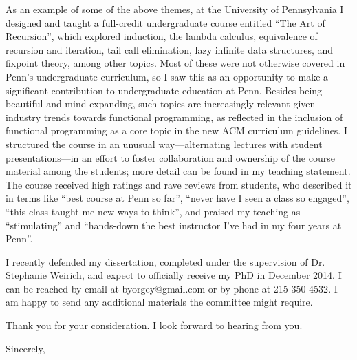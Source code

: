 \begin{letter}{\thereaddress}
{  As an example of some of the above themes, at the University of
  Pennsylvania I designed and taught a full-credit undergraduate
  course entitled ``The Art of Recursion'', which explored induction,
  the lambda calculus, equivalence of recursion and iteration, tail
  call elimination, lazy infinite data structures, and fixpoint
  theory, among other topics.  Most of these were not otherwise
  covered in Penn's undergraduate curriculum, so I saw this as an
  opportunity to make a significant contribution to undergraduate
  education at Penn.  Besides being beautiful and mind-expanding, such
  topics are increasingly relevant given industry trends towards
  functional programming, as reflected in the inclusion of functional
  programming as a core topic in the new ACM curriculum guidelines.  I
  structured the course in an unusual way---alternating lectures with
  student presentations---in an effort to foster collaboration and
  ownership of the course material among the students; more detail can
  be found in my teaching statement.  The course received high ratings
  and rave reviews from students, who described it in terms like
  ``best course at Penn so far'', ``never have I seen a class so
  engaged'', ``this class taught me new ways to think'', and praised
  my teaching as ``stimulating'' and ``hands-down the best instructor
  I've had in my four years at Penn''.

} %

\placespecific

I recently defended my dissertation, completed under the supervision
of Dr. Stephanie Weirich, and expect to officially receive my PhD in
December 2014.  I can be reached by email at
\textsf{byorgey@gmail.com} or by phone at \textsf{215 350 4532}.  I am
happy to send any additional materials the committee might
require.

Thank you for your consideration.  I look forward to hearing from you.

\closing{Sincerely,}

\end{letter}



